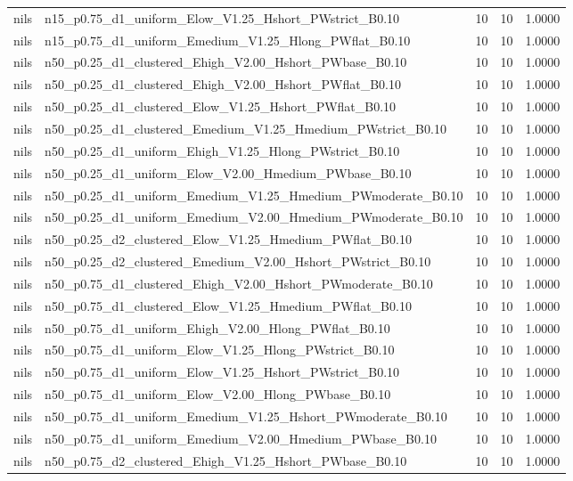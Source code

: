 \begin{tabular}{llrrr}
nils & n15_p0.75_d1_uniform_Elow_V1.25_Hshort_PWstrict_B0.10 & 10 & 10 & 1.0000 \\
nils & n15_p0.75_d1_uniform_Emedium_V1.25_Hlong_PWflat_B0.10 & 10 & 10 & 1.0000 \\
nils & n50_p0.25_d1_clustered_Ehigh_V2.00_Hshort_PWbase_B0.10 & 10 & 10 & 1.0000 \\
nils & n50_p0.25_d1_clustered_Ehigh_V2.00_Hshort_PWflat_B0.10 & 10 & 10 & 1.0000 \\
nils & n50_p0.25_d1_clustered_Elow_V1.25_Hshort_PWflat_B0.10 & 10 & 10 & 1.0000 \\
nils & n50_p0.25_d1_clustered_Emedium_V1.25_Hmedium_PWstrict_B0.10 & 10 & 10 & 1.0000 \\
nils & n50_p0.25_d1_uniform_Ehigh_V1.25_Hlong_PWstrict_B0.10 & 10 & 10 & 1.0000 \\
nils & n50_p0.25_d1_uniform_Elow_V2.00_Hmedium_PWbase_B0.10 & 10 & 10 & 1.0000 \\
nils & n50_p0.25_d1_uniform_Emedium_V1.25_Hmedium_PWmoderate_B0.10 & 10 & 10 & 1.0000 \\
nils & n50_p0.25_d1_uniform_Emedium_V2.00_Hmedium_PWmoderate_B0.10 & 10 & 10 & 1.0000 \\
nils & n50_p0.25_d2_clustered_Elow_V1.25_Hmedium_PWflat_B0.10 & 10 & 10 & 1.0000 \\
nils & n50_p0.25_d2_clustered_Emedium_V2.00_Hshort_PWstrict_B0.10 & 10 & 10 & 1.0000 \\
nils & n50_p0.75_d1_clustered_Ehigh_V2.00_Hshort_PWmoderate_B0.10 & 10 & 10 & 1.0000 \\
nils & n50_p0.75_d1_clustered_Elow_V1.25_Hmedium_PWflat_B0.10 & 10 & 10 & 1.0000 \\
nils & n50_p0.75_d1_uniform_Ehigh_V2.00_Hlong_PWflat_B0.10 & 10 & 10 & 1.0000 \\
nils & n50_p0.75_d1_uniform_Elow_V1.25_Hlong_PWstrict_B0.10 & 10 & 10 & 1.0000 \\
nils & n50_p0.75_d1_uniform_Elow_V1.25_Hshort_PWstrict_B0.10 & 10 & 10 & 1.0000 \\
nils & n50_p0.75_d1_uniform_Elow_V2.00_Hlong_PWbase_B0.10 & 10 & 10 & 1.0000 \\
nils & n50_p0.75_d1_uniform_Emedium_V1.25_Hshort_PWmoderate_B0.10 & 10 & 10 & 1.0000 \\
nils & n50_p0.75_d1_uniform_Emedium_V2.00_Hmedium_PWbase_B0.10 & 10 & 10 & 1.0000 \\
nils & n50_p0.75_d2_clustered_Ehigh_V1.25_Hshort_PWbase_B0.10 & 10 & 10 & 1.0000 \\

\end{tabular}
